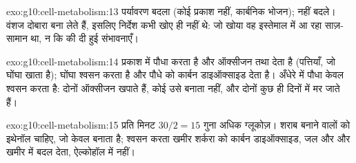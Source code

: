 \begin{solution}{exo:g10:cell-metabolism:13}
पर्यावरण बदला (कोई प्रकाश नहीं, कार्बनिक भोजन);  नहीं बदले। वंशज
 दोबारा बना लेते हैं, इसलिए निर्देश कभी खोए ही नहीं थे: जो खोया वह
इस्तेमाल में आ रहा साज़-सामान था, न कि  की दी हुई संभावनाएँ।
\end{solution}

\begin{solution}{exo:g10:cell-metabolism:14}
प्रकाश में पौधा  करता है और ऑक्सीजन तथा 
देता है (पत्तियाँ, जो घोंघा खाता है); घोंघा श्वसन करता है और पौधे को
कार्बन डाइऑक्साइड देता है। अँधेरे में पौधा केवल श्वसन करता है: दोनों
ऑक्सीजन खपाते हैं, कोई उसे बनाता नहीं, और दोनों कुछ ही दिनों में मर जाते
हैं।
\end{solution}

\begin{solution}{exo:g10:cell-metabolism:15}
प्रति मिनट $30/2 = 15$ गुना अधिक ग्लूकोज़। शराब बनाने वालों को इथेनॉल
चाहिए, जो केवल  बनाता है; श्वसन करता खमीर शर्करा को कार्बन
डाइऑक्साइड, जल और और खमीर में बदल देता, ऐल्कोहॉल में नहीं।
\end{solution}

